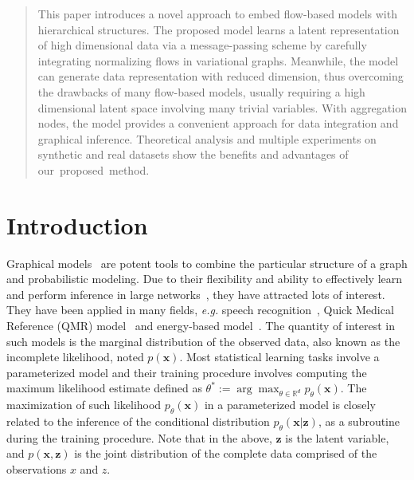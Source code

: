 \documentclass[twoside]{article}
\newcommand{\RN}[1]{%
	\textup{\lowercase\expandafter{\it \romannumeral#1}}%
}
\begin{document}


\begin{abstract}
This paper introduces a novel approach to embed flow-based models with hierarchical structures. The proposed model learns a latent representation of high dimensional data via a message-passing scheme by carefully integrating normalizing flows in variational graphs. Meanwhile, the model can generate data representation with reduced dimension, thus overcoming the drawbacks of many flow-based models, usually requiring a high dimensional latent space involving many trivial variables. With aggregation nodes, the model provides a convenient approach for data integration and graphical inference.  Theoretical analysis and multiple experiments on synthetic and real datasets show the benefits and advantages of our~proposed~method.
\end{abstract}

\vspace{-0.2in}
\section{Introduction}
Graphical models~\cite{madigan1995bayesian,hruschka2007bayesian} are potent tools to combine the particular structure of a graph and probabilistic modeling.
Due to their flexibility and ability to effectively learn and perform inference in large networks~\cite{koller2007graphical}, they have attracted lots of interest. 
They have been applied in many fields, \textit{e.g.} speech recognition~\cite{bilmes2005graphical}, Quick Medical Reference (QMR) model~\cite{shwe1990probabilistic} and energy-based model~\cite{jordan1999graphical}.
The quantity of interest in such models is the marginal distribution of the observed data, also known as the incomplete likelihood, noted $p(\mathbf{x})$.
Most statistical learning tasks involve a parameterized model and their training procedure involves computing the maximum likelihood estimate defined as $\theta^* :=  \arg \max_{\theta \in \mathbb{R}^d} p_{\theta}(\mathbf{x})$.
The maximization of such likelihood $p_{\theta}(\mathbf{x})$ in a parameterized model is closely related to the inference of the conditional distribution $p_{\theta}(\mathbf{x}|\mathbf{z})$, as a subroutine during the training procedure.
Note that in the above, $\mathbf{z}$ is the latent variable, and $p(\mathbf{x}, \mathbf{z})$ is the joint distribution of the complete data comprised of the observations $x$ and $z$. 
\end{document}
